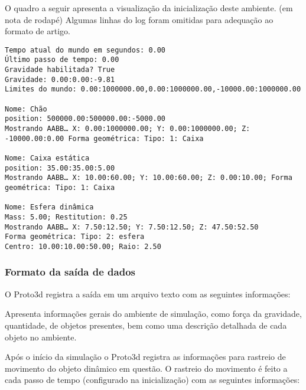 \documentclass[12pt]{article}
\begin{document}
O quadro a seguir apresenta a visualização da inicialização deste ambiente. (em nota de rodapé) Algumas linhas do log foram omitidas para adequação ao formato de artigo.


\begin{lstlisting}[frame=single,caption=Inicialização do ambiente\label{lg:init_world}]
Tempo atual do mundo em segundos: 0.00
Último passo de tempo: 0.00
Gravidade habilitada? True
Gravidade: 0.00:0.00:-9.81
Limites do mundo: 0.00:1000000.00,0.00:1000000.00,-10000.00:1000000.00

Nome: Chão
position: 500000.00:500000.00:-5000.00
Mostrando AABB… X: 0.00:1000000.00; Y: 0.00:1000000.00; Z: -10000.00:0.00 Forma geométrica: Tipo: 1: Caixa

Nome: Caixa estática
position: 35.00:35.00:5.00
Mostrando AABB… X: 10.00:60.00; Y: 10.00:60.00; Z: 0.00:10.00; Forma geométrica: Tipo: 1: Caixa

Nome: Esfera dinâmica
Mass: 5.00; Restitution: 0.25
Mostrando AABB… X: 7.50:12.50; Y: 7.50:12.50; Z: 47.50:52.50
Forma geométrica: Tipo: 2: esfera
Centro: 10.00:10.00:50.00; Raio: 2.50
\end{lstlisting}


\subsubsection{Formato da saída de dados}
O Proto3d registra a saída em um arquivo texto com as seguintes informações:

Apresenta informações gerais do ambiente de simulação, como força da gravidade, quantidade, de objetos presentes, bem como uma descrição detalhada de cada objeto no
ambiente. 

Após o início da simulação o Proto3d registra as informações para rastreio de movimento do objeto dinâmico em questão. O rastreio do movimento é feito a cada passo de tempo (configurado na inicialização) com as seguintes informações:
\end{document}
